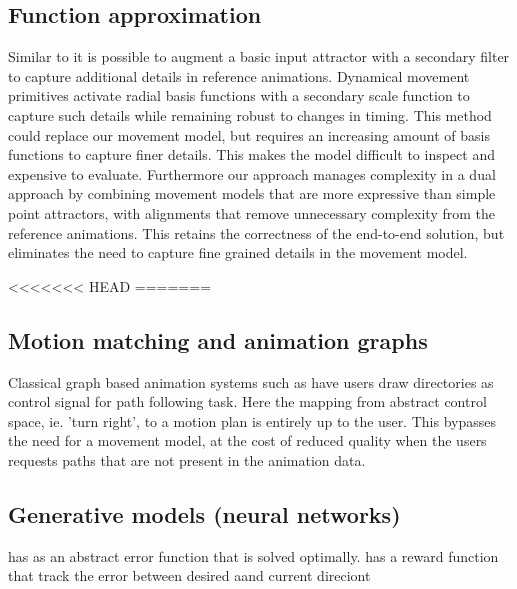 \subsection{Function approximation}
Similar to \citep{startke20} it is possible to augment a basic input attractor with a secondary filter to capture additional details in reference animations. Dynamical movement primitives activate radial basis functions with a secondary scale function to capture such details while remaining robust to changes in timing. This method could replace our movement model, but requires an increasing amount of basis functions to capture finer details. This makes the model difficult to inspect and expensive to evaluate. Furthermore our approach manages complexity in a dual approach by combining movement models that are more expressive than simple point attractors, with alignments that remove unnecessary complexity from the reference animations. This retains the correctness of the end-to-end solution, but eliminates the need to capture fine grained details in the movement model.


<<<<<<< HEAD
=======
\subsection{Motion matching and animation graphs}
Classical graph based animation systems such as \citep{treuille07} have users draw directories as control signal for path following task. Here the mapping from abstract control space, ie. 'turn right', to a motion plan is entirely up to the user. This bypasses the need for a movement model, at the cost of reduced quality when the users requests paths that are not present in the animation data.





\subsection{Generative models (neural networks)}
\citep{kovar02} has as an abstract error function that is solved optimally.
\citep{lee10} has a reward function that track the error between desired aand current direciont

